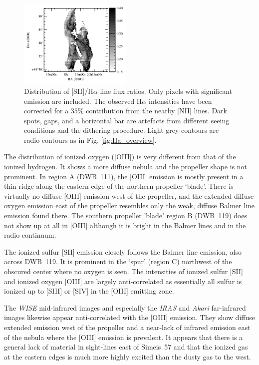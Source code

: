 \documentclass{aa}
\begin{document}

\begin{figure}
   \includegraphics[width=0.48\textwidth]{SII_over_Ha.pdf}
 \centering
 \caption{
   Distribution of [SII]/H$\alpha$ line flux ratios. Only
   pixels with significant emission are included. The observed
   H$\alpha$ intensities have been corrected for a $35\%$ contribution
   from the nearby [NII] lines. Dark spots, gaps, and a horizontal bar
   are artefacts from different seeing conditions and the dithering
   procedure. Light grey contours are radio contours as in Fig. 
   \ref{fig:Ha_overview}.}
\label{fig:SII_over_Ha}
\end{figure}




\par The distribution of ionized oxygen ([OIII]) is very different
from that of the ionized hydrogen.  It shows a more diffuse nebula
and the propeller shape is not prominent.  In region A (DWB~111), the
[OIII] emission is mostly present in a thin ridge along the eastern
edge of the northern propeller `blade'. There is virtually no diffuse
[OIII] emission west of the propeller, and the extended diffuse oxygen
emission east of the propeller resembles only the weak, diffuse Balmer
line emission found there. The southern propeller 'blade' region B
(DWB~119) does not show up at all in [OIII] although it is bright in
the Balmer lines and in the radio continuum.

\par The ionized sulfur [SII] emission closely follows the Balmer line
emission, also across DWB~119.  It is prominent in the `spur' (region
C) northwest of the obscured center where no oxygen is seen. The
intensities of ionized sulfur [SII] and ionized oxygen [OIII] are
largely anti-correlated as essentially all sulfur is ionized up to
[SIII] or [SIV] in the [OIII] emitting zone.

\par The {\it WISE} mid-infrared images and especially the {\it IRAS}
and {\it Akari} far-infrared images likewise appear anti-correlated
with the [OIII] emission. They show diffuse extended emission west of
the propeller and a near-lack of infrared emission east of the nebula
where the [OIII] emission is prevalent. It appears that there is a
general lack of material in sight-lines east of Simeis~57 and that the
ionized gas at the eastern edges is much more highly excited than the
dusty gas to the west.
\end{document}
